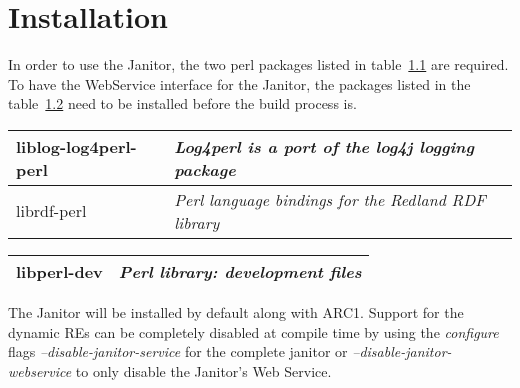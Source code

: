 \chapter{Installation} 




In order to use the Janitor, the two perl packages listed in
table~\ref{tab:install_dependencies} are required. To have
the WebService interface for the Janitor, the packages listed in the
table~\ref{tab:install_dependencies_optional} need to be installed before
the build process is.

\begin{table}[!h]
   \begin{center}
        \label{tab:install_dependencies}
	\begin{tabular}{|p{3cm}|p{7cm}|}
	\hline
	   liblog-log4perl-perl & \textit{Log4perl is a port of the log4j logging package}\\
	\hline
	   librdf-perl          & \textit{Perl language bindings for the Redland RDF library}\\
	\hline
	\end{tabular} 
   \end{center}
\end{table}
\begin{table}[!h]
   \begin{center}
        \label{tab:install_dependencies_optional}
	\begin{tabular}{|p{3cm}|p{7cm}|}
	\hline
	   libperl-dev & \textit{ Perl library: development files}\\
	\hline
	\end{tabular}
   \end{center}
\end{table}
\forcelinebreak

The Janitor will be installed by default along with ARC1. Support for
the dynamic REs can be completely disabled at compile time by using
the \textit{configure} flags \textit{--disable-janitor-service} for
the complete janitor or \textit{--disable-janitor-webservice} to only
disable the Janitor's Web Service.

